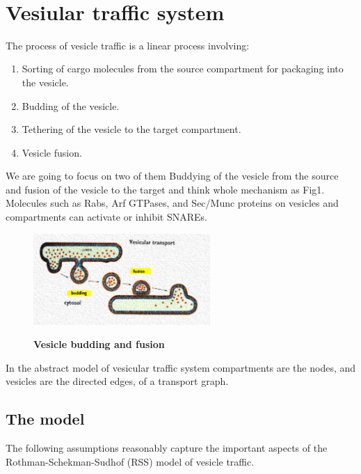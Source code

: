 \documentclass{llncs}
\begin{document}
\vspace*{0.2in}

\begin{flushleft}
{\Large
\textbf{} %
}
\newline
\\
\end{flushleft}

\section{Vesiular traffic system}
The process of vesicle traffic is a linear process involving:
\begin{enumerate}
\item Sorting of cargo molecules from the source compartment for packaging
into the vesicle.
\item Budding of the vesicle.
\item Tethering of the vesicle to the target compartment.
\item Vesicle fusion.
\end{enumerate}

We are going to focus on two of them Buddying of the vesicle from the source and fusion of the vesicle to the target and think whole mechanism as Fig1. Molecules such as Rabs, Arf GTPases, and Sec/Munc proteins on vesicles and compartments can activate or inhibit SNAREs.

\begin{figure}[!h]
\caption{\textbf{Vesicle budding and fusion}}
\includegraphics[width=0.6\textwidth]{2.jpg}
\label{fig1}
\end{figure}
In the abstract model of vesicular traffic system compartments are the nodes, and vesicles are the directed edges, of a transport graph. 

\subsection{The model}
The following assumptions reasonably capture the important aspects of the Rothman-Schekman-Sudhof (RSS) model of vesicle traffic.
\end{document}
